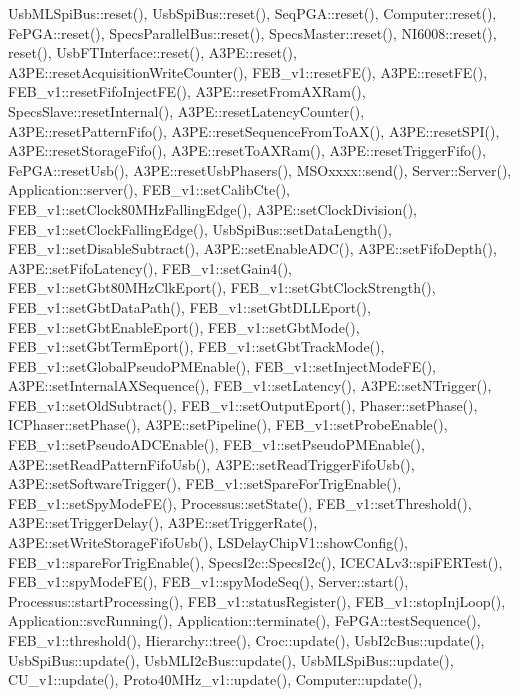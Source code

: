 Usb\+M\+L\+Spi\+Bus\+::reset(), Usb\+Spi\+Bus\+::reset(), Seq\+P\+G\+A\+::reset(), Computer\+::reset(), Fe\+P\+G\+A\+::reset(), Specs\+Parallel\+Bus\+::reset(), Specs\+Master\+::reset(), N\+I6008\+::reset(), reset(), Usb\+F\+T\+Interface\+::reset(), A3\+P\+E\+::reset(), A3\+P\+E\+::reset\+Acquisition\+Write\+Counter(), F\+E\+B\+\_\+v1\+::reset\+F\+E(), A3\+P\+E\+::reset\+F\+E(), F\+E\+B\+\_\+v1\+::reset\+Fifo\+Inject\+F\+E(), A3\+P\+E\+::reset\+From\+A\+X\+Ram(), Specs\+Slave\+::reset\+Internal(), A3\+P\+E\+::reset\+Latency\+Counter(), A3\+P\+E\+::reset\+Pattern\+Fifo(), A3\+P\+E\+::reset\+Sequence\+From\+To\+A\+X(), A3\+P\+E\+::reset\+S\+P\+I(), A3\+P\+E\+::reset\+Storage\+Fifo(), A3\+P\+E\+::reset\+To\+A\+X\+Ram(), A3\+P\+E\+::reset\+Trigger\+Fifo(), Fe\+P\+G\+A\+::reset\+Usb(), A3\+P\+E\+::reset\+Usb\+Phasers(), M\+S\+Oxxxx\+::send(), Server\+::\+Server(), Application\+::server(), F\+E\+B\+\_\+v1\+::set\+Calib\+Cte(), F\+E\+B\+\_\+v1\+::set\+Clock80\+M\+Hz\+Falling\+Edge(), A3\+P\+E\+::set\+Clock\+Division(), F\+E\+B\+\_\+v1\+::set\+Clock\+Falling\+Edge(), Usb\+Spi\+Bus\+::set\+Data\+Length(), F\+E\+B\+\_\+v1\+::set\+Disable\+Subtract(), A3\+P\+E\+::set\+Enable\+A\+D\+C(), A3\+P\+E\+::set\+Fifo\+Depth(), A3\+P\+E\+::set\+Fifo\+Latency(), F\+E\+B\+\_\+v1\+::set\+Gain4(), F\+E\+B\+\_\+v1\+::set\+Gbt80\+M\+Hz\+Clk\+Eport(), F\+E\+B\+\_\+v1\+::set\+Gbt\+Clock\+Strength(), F\+E\+B\+\_\+v1\+::set\+Gbt\+Data\+Path(), F\+E\+B\+\_\+v1\+::set\+Gbt\+D\+L\+L\+Eport(), F\+E\+B\+\_\+v1\+::set\+Gbt\+Enable\+Eport(), F\+E\+B\+\_\+v1\+::set\+Gbt\+Mode(), F\+E\+B\+\_\+v1\+::set\+Gbt\+Term\+Eport(), F\+E\+B\+\_\+v1\+::set\+Gbt\+Track\+Mode(), F\+E\+B\+\_\+v1\+::set\+Global\+Pseudo\+P\+M\+Enable(), F\+E\+B\+\_\+v1\+::set\+Inject\+Mode\+F\+E(), A3\+P\+E\+::set\+Internal\+A\+X\+Sequence(), F\+E\+B\+\_\+v1\+::set\+Latency(), A3\+P\+E\+::set\+N\+Trigger(), F\+E\+B\+\_\+v1\+::set\+Old\+Subtract(), F\+E\+B\+\_\+v1\+::set\+Output\+Eport(), Phaser\+::set\+Phase(), I\+C\+Phaser\+::set\+Phase(), A3\+P\+E\+::set\+Pipeline(), F\+E\+B\+\_\+v1\+::set\+Probe\+Enable(), F\+E\+B\+\_\+v1\+::set\+Pseudo\+A\+D\+C\+Enable(), F\+E\+B\+\_\+v1\+::set\+Pseudo\+P\+M\+Enable(), A3\+P\+E\+::set\+Read\+Pattern\+Fifo\+Usb(), A3\+P\+E\+::set\+Read\+Trigger\+Fifo\+Usb(), A3\+P\+E\+::set\+Software\+Trigger(), F\+E\+B\+\_\+v1\+::set\+Spare\+For\+Trig\+Enable(), F\+E\+B\+\_\+v1\+::set\+Spy\+Mode\+F\+E(), Processus\+::set\+State(), F\+E\+B\+\_\+v1\+::set\+Threshold(), A3\+P\+E\+::set\+Trigger\+Delay(), A3\+P\+E\+::set\+Trigger\+Rate(), A3\+P\+E\+::set\+Write\+Storage\+Fifo\+Usb(), L\+S\+Delay\+Chip\+V1\+::show\+Config(), F\+E\+B\+\_\+v1\+::spare\+For\+Trig\+Enable(), Specs\+I2c\+::\+Specs\+I2c(), I\+C\+E\+C\+A\+Lv3\+::spi\+F\+E\+R\+Test(), F\+E\+B\+\_\+v1\+::spy\+Mode\+F\+E(), F\+E\+B\+\_\+v1\+::spy\+Mode\+Seq(), Server\+::start(), Processus\+::start\+Processing(), F\+E\+B\+\_\+v1\+::status\+Register(), F\+E\+B\+\_\+v1\+::stop\+Inj\+Loop(), Application\+::svc\+Running(), Application\+::terminate(), Fe\+P\+G\+A\+::test\+Sequence(), F\+E\+B\+\_\+v1\+::threshold(), Hierarchy\+::tree(), Croc\+::update(), Usb\+I2c\+Bus\+::update(), Usb\+Spi\+Bus\+::update(), Usb\+M\+L\+I2c\+Bus\+::update(), Usb\+M\+L\+Spi\+Bus\+::update(), C\+U\+\_\+v1\+::update(), Proto40\+M\+Hz\+\_\+v1\+::update(), Computer\+::update(), 